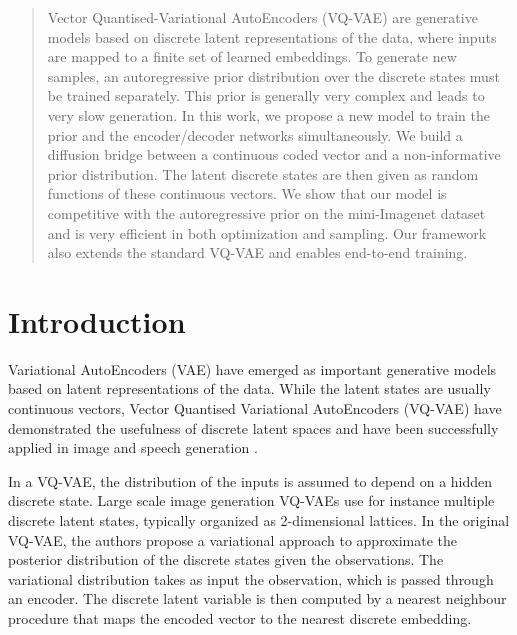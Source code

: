 \documentclass[nohyperref]{article}
\theoremstyle{plain}
\theoremstyle{definition}
\theoremstyle{remark}
\newcommand{\rset}{\mathbb{R}}
\newcommand{\latentdis}{\mathsf{z}_q}
\newcommand{\rme}{\mathrm{e}}
\newcommand{\embedspace}{\mathcal{E}}
\newcommand{\embed}{\rme}
\begin{document}
\begin{abstract}
%
Vector Quantised-Variational AutoEncoders (VQ-VAE) are generative models based on discrete latent representations of the data, where inputs are mapped to a finite set of learned embeddings.
To generate new samples, an autoregressive prior distribution over the discrete states must be trained separately. This prior is generally very complex and leads to very slow generation. In this work, we propose a new model to train the prior and the encoder/decoder networks simultaneously. We build a diffusion bridge between a continuous coded vector and a non-informative prior distribution.  The latent discrete states are then given as random functions of these continuous vectors. We show that our model is competitive with the autoregressive prior on the mini-Imagenet dataset and is very efficient in both optimization and sampling. Our framework also extends the standard VQ-VAE and enables end-to-end training.
 \end{abstract}
% 
\section{Introduction}
Variational AutoEncoders (VAE) have emerged as important generative models based on latent representations of the data. 
While the latent states are usually continuous vectors, Vector Quantised Variational AutoEncoders (VQ-VAE) have demonstrated the usefulness of discrete latent spaces and have been successfully applied in image and speech generation \cite{oord2017neural, esser2021taming, ramesh2021zero}. %

In a VQ-VAE, the distribution of the inputs is assumed to depend on a hidden discrete state. Large scale image generation VQ-VAEs use for instance multiple discrete latent states, typically organized as 2-dimensional lattices. In the original VQ-VAE, the authors propose a variational approach to approximate the posterior distribution of the discrete states given the observations. The variational distribution takes as input the observation, which is passed through an encoder. The discrete latent variable is then computed by a nearest neighbour procedure that maps the encoded vector to the nearest discrete embedding. 
\end{document}
